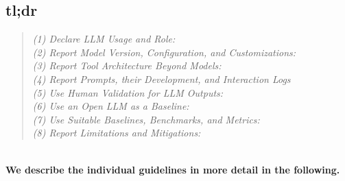 



\subsection{tl;dr}

\begin{quote}
\emph{(1) Declare LLM Usage and Role:}\\


\emph{(2) Report Model Version, Configuration, and Customizations:}\\


\emph{(3) Report Tool Architecture Beyond Models:}\\


\emph{(4) Report Prompts, their Development, and Interaction Logs}\\


\emph{(5) Use Human Validation for LLM Outputs:}\\


\emph{(6) Use an Open LLM as a Baseline:}\\


\emph{(7) Use Suitable Baselines, Benchmarks, and Metrics:}\\


\emph{(8) Report Limitations and Mitigations:}\\

\end{quote}

\ \\
\textbf{We describe the individual guidelines in more detail in the following.}

